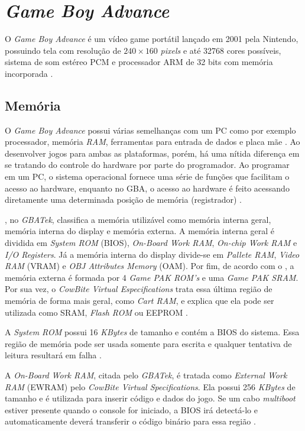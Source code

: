\section{\textit{Game Boy Advance}} \label{gba}

  O \textit{Game Boy Advance} é um vídeo game portátil lançado em 2001 pela Nintendo, possuindo tela com resolução de $240\times160$ \textit{pixels} e até 32768 cores possíveis, sistema de som estéreo PCM e processador ARM de 32 bits com memória incorporada \cite{nintendo}.

  \subsection{Memória}

    O \textit{Game Boy Advance} possui várias semelhanças com um PC como por exemplo processador, memória \textit{RAM}, ferramentas para entrada de dados e placa mãe \cite{harbour}. Ao desenvolver jogos para ambas as plataformas, porém, há uma nítida diferença em se tratando do controle do hardware por parte do programador. Ao programar em um PC, o sistema operacional fornece uma série de funções que facilitam o acesso ao hardware, enquanto no GBA, o acesso ao hardware é feito acessando diretamente uma determinada posição de memória (registrador) \cite{harbour}.

    , no \textit{GBATek}, classifica a memória utilizável como memória interna geral, memória interna do display e memória externa. A memória interna geral é dividida em \textit{System ROM} (BIOS), \textit{On-Board Work RAM}, \textit{On-chip Work RAM} e \textit{I/O Registers}. Já a memória interna do display divide-se em \textit{Pallete RAM}, \textit{Video RAM} (VRAM) e \textit{OBJ Attributes Memory} (OAM). Por fim, de acordo com o , a memória externa é formada por 4 \textit{Game PAK ROM's} e uma \textit{Game PAK SRAM}. Por sua vez, o \textit{CowBite Virtual Especifications} trata essa última região de memória de forma mais geral, como \textit{Cart RAM}, e explica que ela pode ser utilizada como SRAM, \textit{Flash ROM} ou EEPROM \cite{cowbite}.

    A \textit{System ROM} possui 16 \textit{KBytes} de tamanho e contém a BIOS do sistema. Essa região de memória pode ser usada somente para escrita e qualquer tentativa de leitura resultará em falha \cite{cowbite}.

    A \textit{On-Board Work RAM}, citada pelo \textit{GBATek}, é tratada como \textit{External Work RAM} (EWRAM) pelo \textit{CowBite Virtual Specifications}. Ela possui 256 \textit{KBytes} de tamanho e é utilizada para inserir código e dados do jogo. Se um cabo \textit{multiboot} estiver presente quando o console for iniciado, a BIOS irá detectá-lo e automaticamente deverá transferir o código binário para essa região \cite{cowbite}.

